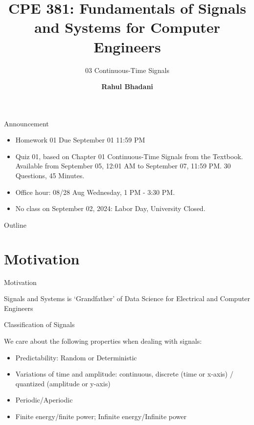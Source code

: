 \documentclass[aspectratio=169,xcolor=dvipsnames,svgnames,x11names,fleqn]{beamer}
\title[CPE 381: Signals and Systems]{CPE 381: Fundamentals of Signals and Systems for Computer Engineers} %
\subtitle{03 Continuous-Time Signals}
\author[Rahul Bhadani] {{\Large \textbf{Rahul Bhadani}}}
\institute[UAH] %
{
    Electrical \& Computer Engineering,  The University of Alabama in Huntsville
}
\date
\begin{document}
\begin{frame}
  \titlepage
\end{frame}

\begin{frame}{Announcement}
\begin{itemize}
    \item Homework 01 Due September 01 11:59 PM
    \item Quiz 01, based on Chapter 01 Continuous-Time Signals from the Textbook. Available from September 05, 12:01 AM to September 07, 11:59 PM. 30 Questions, 45 Minutes.
    \item Office hour: 08/28 Aug Wednesday, 1 PM - 3:30 PM. 
    \item No class on September 02, 2024: Labor Day, University Closed.
\end{itemize}
    
\end{frame}
\begin{frame}{Outline}
   \tableofcontents
\end{frame}

\section{Motivation}


\begin{frame}{}
    \begin{center}
    \Huge \bf \color{DarkBlue}
    \faFire
    
    Motivation
\end{center}
\end{frame}


\begin{frame}{}
    \begin{center}
    \Huge \bf 
    
    Signals and Systems is `Grandfather' of Data Science for Electrical and Computer Engineers

\end{center}
\end{frame}

\begin{frame}{Classification of Signals}

We care about the following properties when dealing with signals:

\begin{itemize}
    \item Predictability:  Random or Deterministic
    \item Variations of time and amplitude: continuous, discrete (time or x-axis) / quantized (amplitude or y-axis)
    \item Periodic/Aperiodic
    \item Finite energy/finite power;  Infinite energy/Infinite power

\end{itemize}

\end{frame}
\end{document}
